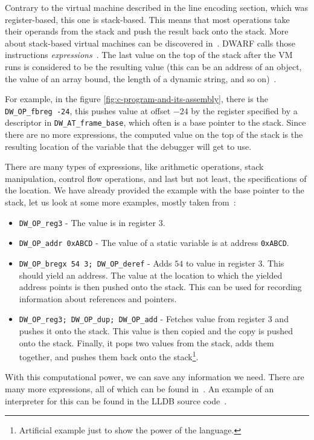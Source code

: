 Contrary to the virtual machine described in the line encoding section, which
was register-based, this one is stack-based. This means that most operations
take their operands from the stack and push the result back onto the stack.
More about stack-based virtual machines can be discovered
in~\cite{crafting-interpreters}. DWARF calls those instructions
\textit{expressions}~\cite{dwarf}. The last value on the top of the stack after
the VM runs is considered to be the resulting value (this can be an address of
an object, the value of an array bound, the length of a dynamic string, and so
on)~\cite{dwarf}.

For example, in the figure \ref{fig:c-program-and-its-assembly}, there is the
\verb|DW_OP_fbreg -24|, this pushes value at offset $-24$ by the register
specified by a descriptor in \verb|DW_AT_frame_base|, which often is a base
pointer to the stack. Since there are no more expressions, the computed value
on the top of the stack is the resulting location of the variable that the
debugger will get to use.

There are many types of expressions, like arithmetic operations, stack
manipulation, control flow operations, and last but not least, the
specifications of the location. We have already provided the example with the
base pointer to the stack, let us look at some more examples, mostly taken
from~\cite{dwarf}:
\begin{itemize}
    \item \verb|DW_OP_reg3| - The value is in register $3$.
    \item \verb|DW_OP_addr 0xABCD| - The value of a static variable is at
        address \verb|0xABCD|.
    \item \verb|DW_OP_bregx 54 3; DW_OP_deref| - Adds $54$ to value in
        register $3$. This should yield an address. The value at the location
        to which the yielded address points is then pushed onto the stack. This
        can be used for recording information about references and pointers.
    \item \verb|DW_OP_reg3; DW_OP_dup; DW_OP_add| - Fetches value from
        register $3$ and pushes it onto the stack. This value is then copied
        and the copy is pushed onto the stack. Finally, it pops two values from
        the stack, adds them together, and pushes them back onto the
        stack\footnote{Artificial example just to show the power of the
        language.}.
\end{itemize}

With this computational power, we can save any information we need. There are
many more expressions, all of which can be found in~\cite{dwarf}. An example of
an interpreter for this can be found in the LLDB source code~\cite{lldb-vm}.

